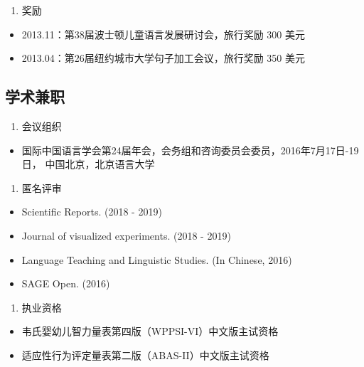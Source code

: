 \documentclass[12pt,]{article}
\providecommand{\tightlist}{%
  \setlength{\itemsep}{0pt}\setlength{\parskip}{0pt}}
\begin{document}
\begin{enumerate}
\def\labelenumi{\arabic{enumi}.}
\setcounter{enumi}{2}
\tightlist
\item
  奖励
\end{enumerate}

\begin{itemize}
\item
  2013.11：第38届波士顿儿童语言发展研讨会，旅行奖励 300 美元
\item
  2013.04：第26届纽约城市大学句子加工会议，旅行奖励 350 美元
\end{itemize}

\hypertarget{ux5b66ux672fux517cux804c}{%
\subsection{学术兼职}\label{ux5b66ux672fux517cux804c}}

\begin{enumerate}
\def\labelenumi{\arabic{enumi}.}
\tightlist
\item
  会议组织
\end{enumerate}

\begin{itemize}
\tightlist
\item
  国际中国语言学会第24届年会，会务组和咨询委员会委员，2016年7月17日-19日，
  中国北京，北京语言大学
\end{itemize}

\begin{enumerate}
\def\labelenumi{\arabic{enumi}.}
\setcounter{enumi}{1}
\tightlist
\item
  匿名评审
\end{enumerate}

\begin{itemize}
\tightlist
\item
  Scientific Reports. (2018 - 2019)
\item
  Journal of visualized experiments. (2018 - 2019)
\item
  Language Teaching and Linguistic Studies. (In Chinese, 2016)
\item
  SAGE Open. (2016)
\end{itemize}

\begin{enumerate}
\def\labelenumi{\arabic{enumi}.}
\setcounter{enumi}{2}
\tightlist
\item
  执业资格
\end{enumerate}

\begin{itemize}
\item
  韦氏婴幼儿智力量表第四版（WPPSI-VI）中文版主试资格
\item
  适应性行为评定量表第二版（ABAS-II）中文版主试资格
\end{itemize}
\end{document}

